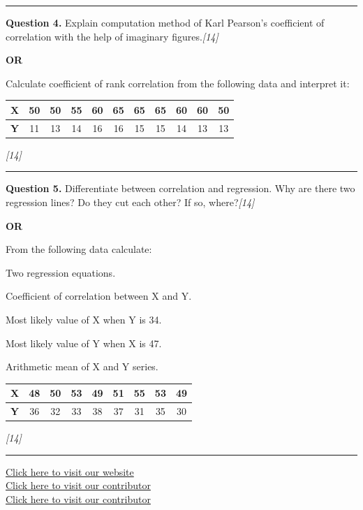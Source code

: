 \documentclass[11pt,a4paper]{article}
\newcommand{\pts}[1]{\hfill   \textit{[#1]}}
\begin{document}
\medskip\rule{\linewidth}{0.2pt}

\pagebreak




\noindent   \textbf{Question 4.}
Explain computation method of Karl Pearson's coefficient of correlation with the help of imaginary figures.\pts{14}

\centerline{   \textbf{OR}}

Calculate coefficient of rank correlation from the following data and interpret it:


\begin{center}
\small

\begin{tabular}{|l|c|c|c|c|c|c|c|c|c|c|}
\hline
   \textbf{X} & 50 & 50 & 55 & 60 & 65 & 65 & 65 & 60 & 60 & 50 \\
\hline
   \textbf{Y} & 11 & 13 & 14 & 16 & 16 & 15 & 15 & 14 & 13 & 13 \\
\hline
\end{tabular}
\end{center}\pts{14}

\medskip\rule{\linewidth}{0.2pt}




\noindent   \textbf{Question 5.}
Differentiate between correlation and regression. Why are there two regression lines? Do they cut each other? If so, where?\pts{14}

\centerline{   \textbf{OR}}

From the following data calculate:

\begin{parts}
  \item Two regression equations.
  \item Coefficient of correlation between X and Y.
  \item Most likely value of X when Y is 34.
  \item Most likely value of Y when X is 47.
  \item Arithmetic mean of X and Y series.
\end{parts}


\begin{center}
\small

\begin{tabular}{|l|c|c|c|c|c|c|c|c|}
\hline
   \textbf{X} & 48 & 50 & 53 & 49 & 51 & 55 & 53 & 49 \\
\hline
   \textbf{Y} & 36 & 32 & 33 & 38 & 37 & 31 & 35 & 30 \\
\hline
\end{tabular}
\end{center}\pts{14}

\vfill
\rule{\linewidth}{0.4pt}

\begin{center}\small
\href{https://bhu-exam.vercel.app/}{Click here to visit our website}\\[4pt]
\href{https://me-aryan.vercel.app/}{Click here to visit our contributor}\\[4pt]
\href{https://quashan-me.vercel.app/}{Click here to visit our contributor}
\end{center}
\end{document}
